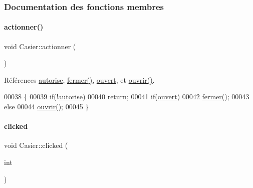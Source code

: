 \subsubsection{Documentation des fonctions membres}
\mbox{\label{class_casier_a9182fdde9d86e8f67e4d96ca3dad5eaa}} 
\paragraph{\texorpdfstring{actionner()}{actionner()}}
{\footnotesize\ttfamily void Casier\+::actionner (\begin{DoxyParamCaption}{ }\end{DoxyParamCaption})}



Références \hyperlink{class_casier_a2dd9fbe4a93685080a9b5c8f69e3f29a}{autorise}, \hyperlink{class_casier_a4a6051d72548b83d4b2dfaf189ae6c72}{fermer()}, \hyperlink{class_casier_afe544ed1a87ce714a9fbbe16126669e4}{ouvert}, et \hyperlink{class_casier_ac4b0de3ba58dc2bab52b049b278f4f90}{ouvrir()}.


\begin{DoxyCode}
00038 \{
00039     \textcolor{keywordflow}{if}(!\hyperlink{class_casier_a2dd9fbe4a93685080a9b5c8f69e3f29a}{autorise})
00040         \textcolor{keywordflow}{return};
00041     \textcolor{keywordflow}{if}(\hyperlink{class_casier_afe544ed1a87ce714a9fbbe16126669e4}{ouvert})
00042         \hyperlink{class_casier_a4a6051d72548b83d4b2dfaf189ae6c72}{fermer}();
00043     \textcolor{keywordflow}{else}
00044         \hyperlink{class_casier_ac4b0de3ba58dc2bab52b049b278f4f90}{ouvrir}();
00045 \}
\end{DoxyCode}
\mbox{\label{class_casier_a5928c3717df16d812410b804f2b0a9a0}} 
\paragraph{\texorpdfstring{clicked}{clicked}\hspace{0.1cm}{\footnotesize\ttfamily [1/2]}}
{\footnotesize\ttfamily void Casier\+::clicked (\begin{DoxyParamCaption}\item[{int}]{ }\end{DoxyParamCaption})\hspace{0.3cm}{\ttfamily [signal]}}

